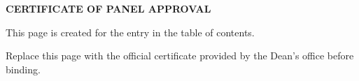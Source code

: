 
\chapter*{ } 			
\thispagestyle{empty}%
\begin{center}
	{\bfseries CERTIFICATE OF PANEL APPROVAL}\\[36pt]
\end{center}
\begin{center}
This page is created for the entry in the table of contents.

Replace this page with the official certificate provided by the Dean's office before binding.
\end{center}